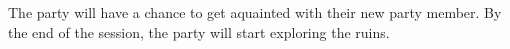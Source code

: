 The party will have a chance to get aquainted with their new party member.
By the end of the session, the party will start exploring the ruins.
